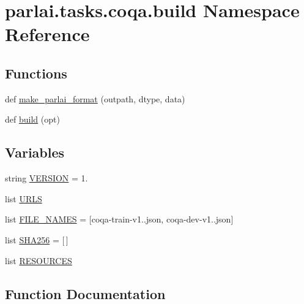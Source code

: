 \hypertarget{namespaceparlai_1_1tasks_1_1coqa_1_1build}{}\section{parlai.\+tasks.\+coqa.\+build Namespace Reference}
\label{namespaceparlai_1_1tasks_1_1coqa_1_1build}
\subsection*{Functions}
\begin{DoxyCompactItemize}
\item 
def \hyperlink{namespaceparlai_1_1tasks_1_1coqa_1_1build_ae2bc52f1ecab4681f1c2ebf013629aec}{make\+\_\+parlai\+\_\+format} (outpath, dtype, data)
\item 
def \hyperlink{namespaceparlai_1_1tasks_1_1coqa_1_1build_ae49969fbac6726d7510f9cefd4b8450a}{build} (opt)
\end{DoxyCompactItemize}
\subsection*{Variables}
\begin{DoxyCompactItemize}
\item 
string \hyperlink{namespaceparlai_1_1tasks_1_1coqa_1_1build_acfdb0f28d99e915a52ffeaa441f932f4}{V\+E\+R\+S\+I\+ON} = \textquotesingle{}1.\textquotesingle{}
\item 
list \hyperlink{namespaceparlai_1_1tasks_1_1coqa_1_1build_a637aa09169ca463f7944e7ec9554f0e0}{U\+R\+LS}
\item 
list \hyperlink{namespaceparlai_1_1tasks_1_1coqa_1_1build_a1b34234fb0de0c56b0fec8db98b9e230}{F\+I\+L\+E\+\_\+\+N\+A\+M\+ES} = \mbox{[}\textquotesingle{}coqa-\/train-\/v1..\+json\textquotesingle{}, \textquotesingle{}coqa-\/dev-\/v1..\+json\textquotesingle{}\mbox{]}
\item 
list \hyperlink{namespaceparlai_1_1tasks_1_1coqa_1_1build_abac5f27f3ac9554a50b41b0088ec3fbb}{S\+H\+A256} = \mbox{[}$\,$\mbox{]}
\item 
list \hyperlink{namespaceparlai_1_1tasks_1_1coqa_1_1build_a7bb45b9538e95720878022ca1db0c715}{R\+E\+S\+O\+U\+R\+C\+ES}
\end{DoxyCompactItemize}


\subsection{Function Documentation}
\mbox{\label{namespaceparlai_1_1tasks_1_1coqa_1_1build_ae49969fbac6726d7510f9cefd4b8450a}} 
